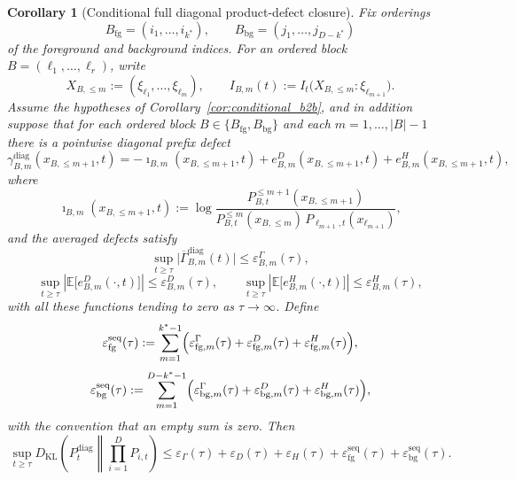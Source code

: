\documentclass[12pt]{article}
\newtheorem{corollary}[theorem]{Corollary}
\theoremstyle{definition}
\theoremstyle{remark}
\begin{document}
\begin{corollary}[Conditional full diagonal product-defect closure]\label{cor:conditional_full_prod}
Fix orderings
\[
B_{\mathrm{fg}}=(i_1,\dots,i_{k^*}),
\qquad
B_{\mathrm{bg}}=(j_1,\dots,j_{D-k^*})
\]
of the foreground and background indices. For an ordered block
\(B=(\ell_1,\dots,\ell_r)\), write
\[
X_{B,\le m}:=(\xi_{\ell_1},\dots,\xi_{\ell_m}),
\qquad
I_{B,m}(t):=I_t\!\bigl(X_{B,\le m}:\xi_{\ell_{m+1}}\bigr).
\]
Assume the hypotheses of Corollary~\ref{cor:conditional_b2b}, and in
addition suppose that for each ordered block
\(B\in\{B_{\mathrm{fg}},B_{\mathrm{bg}}\}\) and each
\(m=1,\dots,|B|-1\) there is a pointwise diagonal prefix defect
\[
\gamma_{B,m}^{\mathrm{diag}}(x_{B,\le m+1},t)
=
-\imath_{B,m}(x_{B,\le m+1},t)
+
e_{B,m}^D(x_{B,\le m+1},t)
+
e_{B,m}^H(x_{B,\le m+1},t),
\]
where
\[
\imath_{B,m}(x_{B,\le m+1},t)
:=
\log\frac{
P_{B,t}^{\le m+1}(x_{B,\le m+1})
}{
P_{B,t}^{\le m}(x_{B,\le m})\,P_{\ell_{m+1},t}(x_{\ell_{m+1}})
},
\]
and the averaged defects satisfy
\[
\sup_{t\ge\tau}
\bigl|
\overline{\Gamma}_{B,m}^{\mathrm{diag}}(t)
\bigr|
\le
\varepsilon_{B,m}^{\Gamma}(\tau),
\]
\[
\sup_{t\ge\tau}
\left|
\mathbb E\!\bigl[e_{B,m}^{D}(\cdot,t)\bigr]
\right|
\le
\varepsilon_{B,m}^{D}(\tau),
\qquad
\sup_{t\ge\tau}
\left|
\mathbb E\!\bigl[e_{B,m}^{H}(\cdot,t)\bigr]
\right|
\le
\varepsilon_{B,m}^{H}(\tau),
\]
with all these functions tending to zero as \(\tau\to\infty\). Define
\[
\varepsilon_{\mathrm{fg}}^{\mathrm{seq}}(\tau)
:=
\sum_{m=1}^{k^*-1}
\Bigl(
\varepsilon_{\mathrm{fg},m}^{\Gamma}(\tau)
+
\varepsilon_{\mathrm{fg},m}^{D}(\tau)
+
\varepsilon_{\mathrm{fg},m}^{H}(\tau)
\Bigr),
\]
\[
\varepsilon_{\mathrm{bg}}^{\mathrm{seq}}(\tau)
:=
\sum_{m=1}^{D-k^*-1}
\Bigl(
\varepsilon_{\mathrm{bg},m}^{\Gamma}(\tau)
+
\varepsilon_{\mathrm{bg},m}^{D}(\tau)
+
\varepsilon_{\mathrm{bg},m}^{H}(\tau)
\Bigr),
\]
with the convention that an empty sum is zero. Then
\[
\sup_{t\ge\tau}
D_{\mathrm{KL}}\!\left(
P_t^{\mathrm{diag}}
\middle\|
\prod_{i=1}^D P_{i,t}
\right)
\le
\varepsilon_\Gamma(\tau)
+
\varepsilon_D(\tau)
+
\varepsilon_H(\tau)
+
\varepsilon_{\mathrm{fg}}^{\mathrm{seq}}(\tau)
+
\varepsilon_{\mathrm{bg}}^{\mathrm{seq}}(\tau).
\]
\end{corollary}
\end{document}
